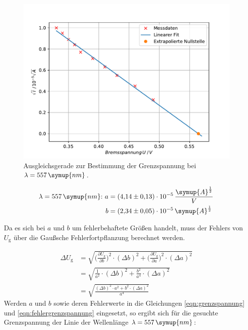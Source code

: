 \begin{figure}[h!tbp]
	\centering
	\includegraphics[width=0.8\linewidth]{LinieORANGE.pdf}
	\caption{Ausgleichsgerade zur Bestimmung der Grenzspannung bei $\lambda = 557\,\symup{nm}$.}
	\label{fig:orange}
\end{figure}

\begin{equation*}
\begin{aligned}
\lambda = 557\,\symup{nm} \text{:} \,\, a &=  (4{,}14 \pm 0{,}13)\cdot 10^{-5}\, \frac{\symup{A}^{\frac{1}{2}}}{V}\\
b &= (2{,}34 \pm 0{,}05)\cdot 10^{-5}\, \symup{A}^{\frac{1}{2}}\\ 
\end{aligned}
\end{equation*}

Da es sich bei $a$ und $b$ um fehlerbehaftete Größen handelt, muss der Fehlers von $U_{\text{g}}$ über die Gaußsche Fehlerfortpflanzung berechnet werden.

\begin{equation}
\begin{aligned}
\Delta{U}_{\text{g}} &= \sqrt{\biggl(\frac{\partial{U_{\text{g}}}}{\partial{b}}\biggr)^2 \cdot (\Delta b)^2+ \biggl(\frac{\partial{U_{\text{g}}}}{\partial{a}}\biggr)^2 \cdot (\Delta a)^2} \\
                     &= \sqrt{\frac{1}{a^2}\cdot (\Delta b)^2 + \frac{b^2}{a^4}\cdot (\Delta a)^2} \\
					 &= \sqrt{\frac{(\Delta b)^2 \cdot a^2 + b^2 \cdot (\Delta a)^2}{a^4}}
\label{eqn:fehlergrenzspannung}					 
\end{aligned}
\end{equation}
Werden $a$ und $b$ sowie deren Fehlerwerte in die Gleichungen \ref{eqn:grenzspannung} und \ref{eqn:fehlergrenzspannung} eingesetzt, so ergibt sich für die gesuchte Grenzspannung der Linie der Wellenlänge $\lambda = 557\,\symup{nm}$:

